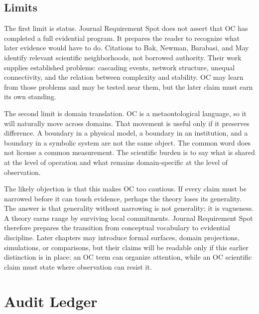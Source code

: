 \documentclass[11pt,a4paper,openany]{book}
\begin{document}
\subsection{Limits}
The first limit is status. Journal Requirement Spot does not assert that OC has completed a full evidential program. It prepares the reader to recognize what later evidence would have to do. Citations to Bak, Newman, Barabasi, and May identify relevant scientific neighborhoods, not borrowed authority. Their work supplies established problems: cascading events, network structure, unequal connectivity, and the relation between complexity and stability. OC may learn from those problems and may be tested near them, but the later claim must earn its own standing. \cite{bak_soc,newman_networks}\par
The second limit is domain translation. OC is a metaontological language, so it will naturally move across domains. That movement is useful only if it preserves difference. A boundary in a physical model, a boundary in an institution, and a boundary in a symbolic system are not the same object. The common word does not license a common measurement. The scientific burden is to say what is shared at the level of operation and what remains domain-specific at the level of observation.\par
The likely objection is that this makes OC too cautious. If every claim must be narrowed before it can touch evidence, perhaps the theory loses its generality. The answer is that generality without narrowing is not generality; it is vagueness. A theory earns range by surviving local commitments. Journal Requirement Spot therefore prepares the transition from conceptual vocabulary to evidential discipline. Later chapters may introduce formal surfaces, domain projections, simulations, or comparisons, but their claims will be readable only if this earlier distinction is in place: an OC term can organize attention, while an OC scientific claim must state where observation can resist it.\par
\section{Audit Ledger}
\end{document}
